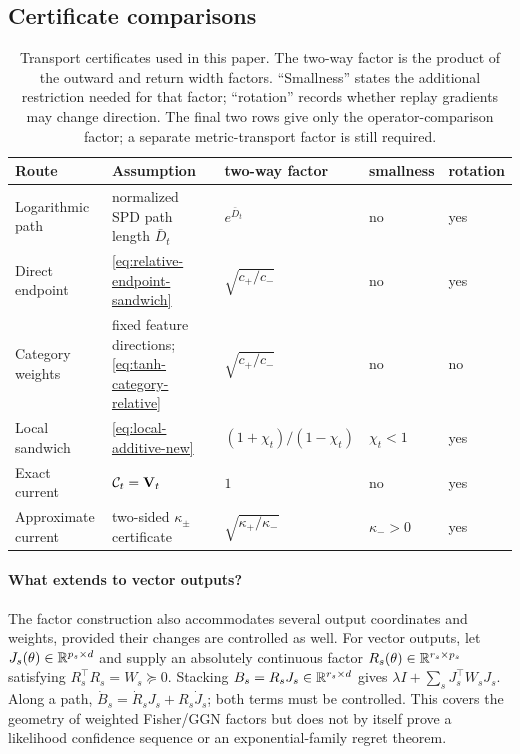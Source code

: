 \subsection{Certificate comparisons}


\begin{table}[H]
\caption{Transport certificates used in this paper.  The two-way factor is
the product of the outward and return width factors.  ``Smallness'' states
the additional restriction needed for that factor; ``rotation'' records
whether replay gradients may change direction. The final two rows give only
the operator-comparison factor; a separate metric-transport factor is still
required.}
\label{tab:transport-comparison-new}
\centering\ccetablesize
\begin{tabularx}{\columnwidth}{@{}
  >{\raggedright\arraybackslash}p{}
  >{\raggedright\arraybackslash}X
  >{\raggedright\arraybackslash}p{}
  >{\centering\arraybackslash}p{}
  >{\centering\arraybackslash}p{}@{}}
\toprule
Route & Assumption & two-way factor & smallness & rotation \\
\midrule
Logarithmic path & normalized SPD path length $\bar D_t$ & $e^{\bar D_t}$ & no & yes \\
Direct endpoint & \eqref{eq:relative-endpoint-sandwich} & $\sqrt{c_+/c_-}$ & no & yes \\
Category weights & fixed feature directions; \eqref{eq:tanh-category-relative} & $\sqrt{c_+/c_-}$ & no & no \\
Local sandwich & \eqref{eq:local-additive-new} & $(1+\chi_t)/(1-\chi_t)$ & $\chi_t<1$ & yes \\
Exact current & $\mathcal{C}_t=\mathbf{V}_t$ & $1$ & no & yes \\
Approximate current & two-sided $\kappa_\pm$ certificate & $\sqrt{\kappa_+/\kappa_-}$ & $\kappa_->0$ & yes \\
\bottomrule
\end{tabularx}

\end{table}

\paragraph{What extends to vector outputs?}
The factor construction also accommodates several output coordinates and
weights, provided their changes are controlled as well.  For vector outputs,
let $J_s(\theta)\in\mathbb{R}^{p_s\times d}$ and supply an
absolutely continuous factor $R_s(\theta)\in\mathbb{R}^{r_s\times p_s}$ satisfying
$R_s^\top R_s=W_s\succeq0$.  Stacking
$B_s=R_sJ_s\in\mathbb{R}^{r_s\times d}$ gives
$\lambda I+\sum_sJ_s^\top W_sJ_s$.  Along a path,
$\dot B_s=\dot R_sJ_s+R_s\dot J_s$; both terms must be controlled.  This
covers the geometry of weighted Fisher/GGN factors but does not by itself prove
a likelihood confidence sequence or an exponential-family regret theorem.

